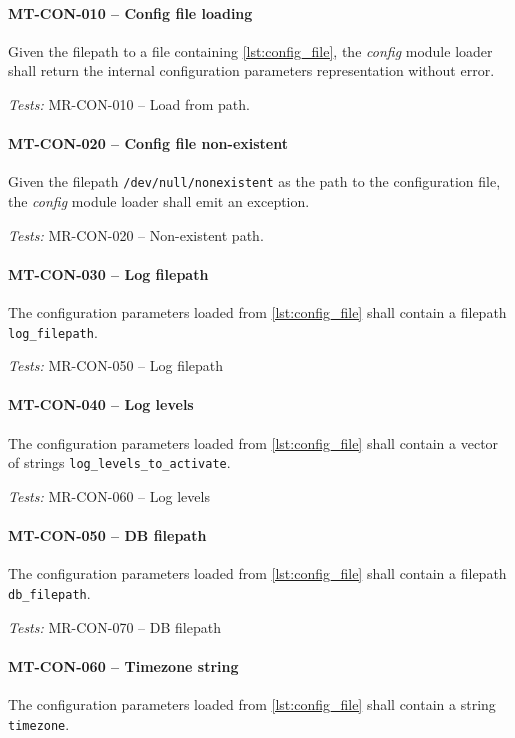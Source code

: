 \paragraph{MT-CON-010 -- Config file loading}
Given the filepath to a file containing \cref{lst:config_file},
the \emph{config} module loader shall return the internal configuration
parameters representation without error.

\textit{Tests: } MR-CON-010 -- Load from path.

\paragraph{MT-CON-020 -- Config file non-existent}
Given the filepath \lstinline{/dev/null/nonexistent} as the path
to the configuration file, the \emph{config} module loader shall
emit an exception.

\textit{Tests: } MR-CON-020 -- Non-existent path.

\paragraph{MT-CON-030 -- Log filepath}
The configuration parameters loaded from \cref{lst:config_file}
shall contain a filepath \lstinline{log_filepath}.

\textit{Tests: } MR-CON-050 -- Log filepath

\paragraph{MT-CON-040 -- Log levels}
The configuration parameters loaded from \cref{lst:config_file}
shall contain a vector of strings \lstinline{log_levels_to_activate}.

\textit{Tests: } MR-CON-060 -- Log levels

\paragraph{MT-CON-050 -- DB filepath}
The configuration parameters loaded from \cref{lst:config_file}
shall contain a filepath \lstinline{db_filepath}.

\textit{Tests: } MR-CON-070 -- DB filepath

\paragraph{MT-CON-060 -- Timezone string}
The configuration parameters loaded from \cref{lst:config_file}
shall contain a string \lstinline{timezone}.

